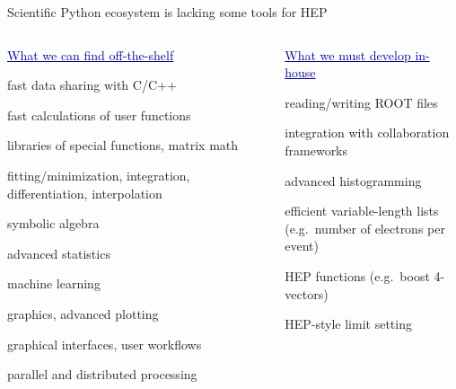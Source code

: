 \documentclass[aspectratio=169]{beamer}
\begin{document}
\begin{frame}{Scientific Python ecosystem is lacking some tools for HEP}
\vspace{-0.5 cm}
\begin{columns}[t]
\begin{center}
\textcolor{darkblue}{\underline{\large What we can find off-the-shelf}}

\vspace{0.18 cm}
fast data sharing with C/C++

\vspace{0.18 cm}
fast calculations of user functions

\vspace{0.18 cm}
libraries of special functions, matrix math

\vspace{0.18 cm}
fitting/minimization, integration, differentiation, interpolation

\vspace{0.18 cm}
symbolic algebra

\vspace{0.18 cm}
advanced statistics

\vspace{0.18 cm}
machine learning

\vspace{0.18 cm}
graphics, advanced plotting

\vspace{0.18 cm}
graphical interfaces, user workflows

\vspace{0.18 cm}
parallel and distributed processing
\end{center}

\begin{center}
\textcolor{darkblue}{\underline{\large What we must develop in-house}}

\vspace{0.18 cm}
reading/writing ROOT files

\vspace{0.18 cm}
integration with collaboration frameworks

\vspace{0.18 cm}
advanced histogramming

\vspace{0.18 cm}
efficient variable-length lists \\ (e.g.\ number of electrons per event)

\vspace{0.18 cm}
HEP functions (e.g.\ boost 4-vectors)

\vspace{0.18 cm}
HEP-style limit setting
\end{center}
\end{columns}
\end{frame}
\end{document}
